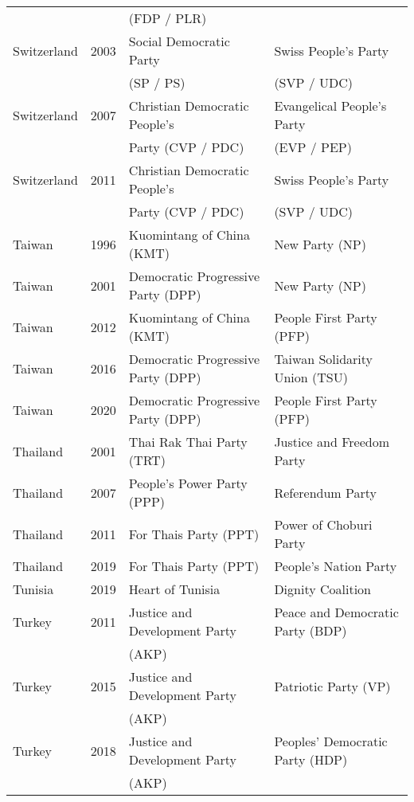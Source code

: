 {\begin{longtable}{|l|c|l|l|}
               &      &      (FDP / PLR)  &     \\ 
   Switzerland & 2003 &        Social Democratic Party &   Swiss People's Party  \\ 
               &      &     (SP / PS)     &    (SVP / UDC) \\ 
   Switzerland & 2007 &   Christian Democratic People's  &   Evangelical People's Party  \\ 
               &      &        Party (CVP / PDC) &    (EVP / PEP) \\ 
   Switzerland & 2011 &   Christian Democratic People's  &   Swiss People's Party \\ 
               &      &       Party (CVP / PDC)  &     (SVP / UDC) \\ 
   Taiwan & 1996 &   Kuomintang of China (KMT)  &   New Party (NP)   \\ 
   Taiwan & 2001 &   Democratic Progressive Party (DPP) &   New Party (NP)   \\ 
  Taiwan & 2012 &   Kuomintang of China (KMT)  &   People First Party (PFP)   \\ 
  Taiwan & 2016 &   Democratic Progressive Party (DPP) &   Taiwan Solidarity Union (TSU) \\ 
  Taiwan & 2020 &   Democratic Progressive Party (DPP) &   People First Party (PFP)   \\ 
  Thailand & 2001 &   Thai Rak Thai Party (TRT) &   Justice and Freedom Party \\ 
  Thailand & 2007 &   People's Power Party (PPP) &   Referendum Party  \\ 
  Thailand & 2011 &   For Thais Party (PPT) &   Power of Choburi Party \\ 
  Thailand & 2019 &   For Thais Party (PPT) &   People's Nation Party \\ 
  Tunisia & 2019 &   Heart of Tunisia &   Dignity Coalition \\ 
   Turkey & 2011 &   Justice and Development Party &   Peace and Democratic Party (BDP)   \\ 
               &      &       (AKP) &     \\ 
   Turkey & 2015 &   Justice and Development Party &   Patriotic Party (VP) \\ 
               &      &  (AKP)      &     \\ 
  Turkey & 2018 &   Justice and Development Party &   Peoples' Democratic Party (HDP)   \\ 
               &      &    (AKP)    &     \\ 

\end{longtable}}
